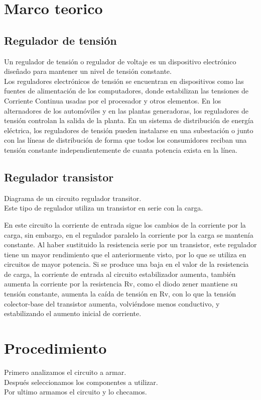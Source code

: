 \documentclass[12pt,a4paper]{article}
\begin{document}
\section{Marco teorico}
\subsection{Regulador de tensión}
Un regulador de tensión o regulador de voltaje es un dispositivo electrónico diseñado para mantener un nivel de tensión constante. \\
Los reguladores electrónicos de tensión se encuentran en dispositivos como las fuentes de alimentación de los computadores, donde estabilizan las tensiones de Corriente Continua usadas por el procesador y otros elementos. En los alternadores de los automóviles y en las plantas generadoras, los reguladores de tensión controlan la salida de la planta. En un sistema de distribución de energía eléctrica, los reguladores de tensión pueden instalarse en una subestación o junto con las líneas de distribución de forma que todos los consumidores reciban una tensión constante independientemente de cuanta potencia exista en la línea.

\subsection{Regulador transistor}
Diagrama de un circuito regulador transitor.\\
Este tipo de regulador utiliza un transistor en serie con la carga.

En este circuito la corriente de entrada sigue los cambios de la corriente por la carga, sin embargo, en el regulador paralelo la corriente por la carga se mantenía constante. Al haber sustituido la resistencia serie por un transistor, este regulador tiene un mayor rendimiento que el anteriormente visto, por lo que se utiliza en circuitos de mayor potencia. Si se produce una baja en el valor de la resistencia de carga, la corriente de entrada al circuito estabilizador aumenta, también aumenta la corriente por la resistencia Rv, como el diodo zener mantiene su tensión constante, aumenta la caída de tensión en Rv, con lo que la tensión colector-base del transistor aumenta, volviéndose menos conductivo, y estabilizando el aumento inicial de corriente.
\newpage
\section{Procedimiento}
Primero analizamos el circuito a armar.\\
Después seleccionamos los componentes a utilizar.\\
Por ultimo armamos el circuito y lo checamos.\\
\end{document}
